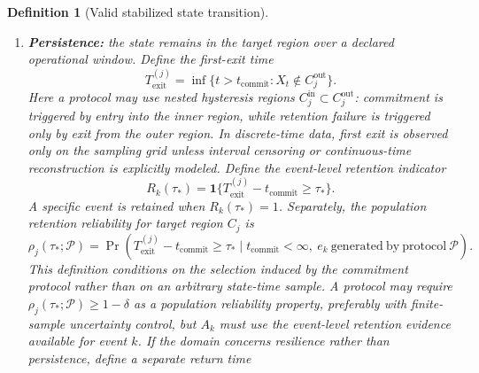\documentclass[11pt,a4paper]{article}
\newtheorem{definition}{Definition}
\newcommand{\1}{\mathbf{1}}
\begin{document}
\begin{definition}[Valid stabilized state transition]
\begin{enumerate}
\[    \Pr[d_M(Y)=j\mid X\in C_i]\leq\beta_{ij},
    \quad i\neq j.
  \]
  In multiclass settings, report a locked confusion criterion, for example
  \[
    \max_i \Pr[d_M(Y)\neq i\mid X\in C_i]\leq\alpha
  \]
  together with the full confusion matrix
  \[
    E_{jk}=\Pr[d_M(Y)=k\mid X\in C_j].
  \]
  Distinguishability can be treated as a protocol-level validation flag $Q_{\mathrm{dist}}(M,\{C_i\})=1$ for the measurement system, or as a transition-specific validation flag $Q_{\mathrm{dist},ij}=1$ for the particular candidate transition $C_i\to C_j$; localization remains event-specific.
  Pairwise Bayes error may be used only after specifying priors and loss function, e.g. $e_{\mathrm{Bayes}}(P_j,P_k;\pi_j,\pi_k,L)$.
  Confirmatory distinguishability should be qualified with finite-sample uncertainty. For example, a point estimate $\hat e_i\leq\alpha_i$ is insufficient by itself; the locked rule should require an upper confidence or credible bound $U_{1-\eta}(e_i)\leq\alpha_i$, or an equivalent pre-specified decision-risk criterion.
  \item \textbf{Persistence:} the state remains in the target region over a declared operational window. Define the first-exit time
  \[
    T^{(j)}_{\mathrm{exit}}=\inf\{t>t_{\mathrm{commit}}:X_t\notin C_j^{\mathrm{out}}\}.
  \]
  Here a protocol may use nested hysteresis regions $C_j^{\mathrm{in}}\subset C_j^{\mathrm{out}}$: commitment is triggered by entry into the inner region, while retention failure is triggered only by exit from the outer region. In discrete-time data, first exit is observed only on the sampling grid unless interval censoring or continuous-time reconstruction is explicitly modeled.
  Define the event-level retention indicator
  \[
    R_k(\tau_\ast)
    =
    \1\{T^{(j)}_{\mathrm{exit}}-t_{\mathrm{commit}}\geq \tau_\ast\}.
  \]
  A specific event is retained when $R_k(\tau_\ast)=1$. Separately, the population retention reliability for target region $C_j$ is
  \[
    \rho_j(\tau_\ast;\mathcal{P})=
    \Pr(T^{(j)}_{\mathrm{exit}}-t_{\mathrm{commit}}\geq \tau_\ast
    \mid t_{\mathrm{commit}}<\infty,\ e_k\ \mathrm{generated\ by\ protocol}\ \mathcal{P}).
  \]
  This definition conditions on the selection induced by the commitment protocol rather than on an arbitrary state-time sample. A protocol may require $\rho_j(\tau_\ast;\mathcal{P})\geq1-\delta$ as a population reliability property, preferably with finite-sample uncertainty control, but $A_k$ must use the event-level retention evidence available for event $k$.
  If the domain concerns resilience rather than persistence, define a separate return time

\end{enumerate}
\end{definition}
\end{document}
